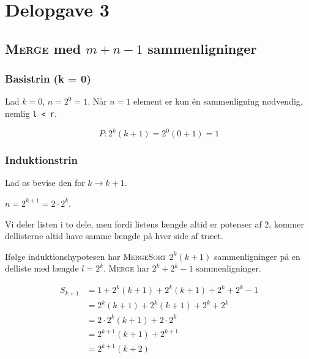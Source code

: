 \section{Delopgave 3}\label{sec:delopgave-33}

\subsection{\textsc{Merge} med \(m + n - 1\) sammenligninger}\label{subsec:merge-med-m-+-n-1-sammenligninger}

\subsubsection{Basistrin (k = 0)}

Lad \(k = 0\), \(n = 2^0 = 1\).
Når \(n = 1\) element er kun én sammenligning nødvendig, nemlig \lstinline{l < r}.

\begin{equation}
    P: 2^k(k + 1) = 2^0(0 + 1) = 1
    \label{eq:equation18}
\end{equation}

\subsubsection{Induktionstrin}

Lad os bevise den for \(k \rightarrow k + 1\).

\(n = 2^{k + 1} = 2 \cdot 2^k\).

Vi deler listen i to dele, men fordi listens længde altid er potenser af \(2\), kommer dellisterne altid have samme
længde på hver side af træet.

Ifølge induktionshypotesen har \textsc{MergeSort} \(2^k(k + 1)\) sammenligninger på en delliste med længde \(l = 2^k\).
\textsc{Merge} har \(2^k + 2^k - 1\) sammenligninger.

\begin{equation}
    \begin{aligned}
        S_{k + 1} & = 1 + 2^k(k + 1) + 2^k(k + 1) + 2^k + 2^k - 1 \\
        & = 2^k(k + 1) + 2^k(k + 1) + 2^k + 2^k \\
        & = 2 \cdot 2^k(k + 1) + 2 \cdot 2^k \\
        & = 2^{k + 1}(k + 1) + 2^{k + 1} \\
        & = 2^{k + 1}(k + 2)
    \end{aligned}
    \label{eq:equation19}
\end{equation}

